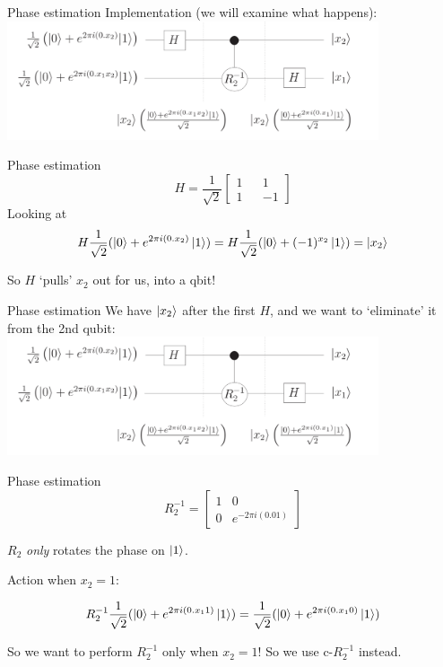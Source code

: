 \documentclass{beamer}
\begin{document}
\begin{frame}{Phase estimation}
    Implementation (we will examine what happens):
    \centering \includegraphics[height=3.5cm]{phase-estimation.png}
\end{frame}
\begin{frame}{Phase estimation}
    $$H = \frac{1}{\sqrt{2}} \begin{bmatrix}
        1 && 1 \\
        1 && -1
    \end{bmatrix}$$ 
    Looking at $$H \frac{1}{\sqrt{2}}(\ket{0} + e^{2\pi i (0.x_2)} \ket{1}) = H \frac{1}{\sqrt{2}}(\ket{0} + (-1)^{x_2} \ket{1}) = \ket{x_2}$$ \pause
    
    So $H$ `pulls' $x_2$ out for us, into a qbit!
\end{frame}
\begin{frame}{Phase estimation}
    We have $\ket{x_2}$ after the first $H$, and we want to `eliminate' it from the 2nd qubit:
    \centering \includegraphics[height=3.5cm]{phase-estimation.png}
\end{frame}
\begin{frame}{Phase estimation}
    $$R_2^{-1} = \begin{bmatrix}
        1 & 0 \\
        0 & e^{- 2 \pi i (0.01)}
    \end{bmatrix}$$
    
    $R_2$ \textit{only} rotates the phase on $\ket{1}$.
    
    Action when $x_2 = 1$:
    
    $$R_2^{-1} \frac{1}{\sqrt{2}}(\ket{0} + e^{2\pi i (0.x_1 1)} \ket{1}) =  \frac{1}{\sqrt{2}}(\ket{0} + e^{2\pi i (0.x_1 0)} \ket{1})$$ \pause
    
    So we want to perform $R_2^{-1}$ only when $x_2 = 1$! So we use c-$R_2^{-1}$ instead.
\end{frame} 
\end{document}
